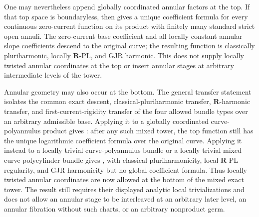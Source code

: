 One may nevertheless append globally coordinated annular factors at the
top.  If that top space is boundaryless, then
 gives a unique
coefficient formula for every continuous zero-current function on its
product with finitely many standard strict open annuli.  The zero-current
base coefficient and all locally constant annular slope coefficients
descend to the original curve; the resulting function is classically
pluriharmonic, locally \(\mathbf R\)-PL, and GJR harmonic.  This does not
supply locally twisted annular coordinates at the top or insert annular
stages at arbitrary intermediate levels of the tower.

Annular geometry may also occur at the bottom.  The general transfer
statement  isolates the
common exact descent, classical-pluriharmonic transfer,
\(\mathbf R\)-harmonic transfer, and first-current-rigidity transfer of the
four allowed bundle types over an arbitrary admissible base.  Applying it
to a globally coordinated curve-polyannulus product gives
: after any such mixed
tower, the top function still has the unique logarithmic coefficient formula
over the original curve.  Applying it instead to a locally trivial
curve-polyannulus bundle or a locally trivial mixed curve-polycylinder bundle
gives
,
with classical pluriharmonicity, local \(\mathbf R\)-PL regularity, and GJR
harmonicity but no global coefficient formula.  Thus locally twisted
annular coordinates are now allowed at the bottom of the mixed exact tower.
The result still requires their displayed analytic local trivializations and
does not allow an annular stage to be interleaved at an arbitrary later
level, an annular fibration without such charts, or an arbitrary nonproduct
germ.

